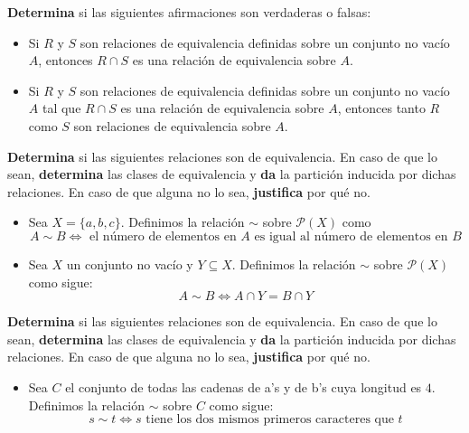 \documentclass[oneside]{style}
\begin{document}
\begin{questions}[label=\protect\circled{\bfseries\arabic*}]
    \question
    {
        \textbf{Determina} si las siguientes afirmaciones son verdaderas o 
        falsas:
        \begin{itemize}
            \item Si $R$ y $S$ son relaciones de equivalencia definidas sobre 
            un conjunto no vacío $A$, entonces $R \cap S$ es una relación de 
            equivalencia sobre $A$. 

            \item Si $R$ y $S$ son relaciones de equivalencia definidas sobre 
            un conjunto no vacío $A$ tal que $R \cap S$ es una relación de 
            equivalencia sobre $A$, entonces tanto $R$ como $S$ son relaciones 
            de equivalencia sobre $A$.  
        \end{itemize}
    }

    \question
    {
        \textbf{Determina} si las siguientes relaciones son de equivalencia. 
        En caso de que lo sean, \textbf{determina} las clases de equivalencia 
        y \textbf{da} la partición inducida por dichas relaciones. En caso de 
        que alguna no lo sea, \textbf{justifica} por qué no. 
        \begin{itemize}
            \item Sea $X = \{a,b,c\}$. Definimos la relación $\sim$ sobre 
            $\mathcal{P}(X)$ como 
            \begin{equation*}
                A \sim B \Leftrightarrow \text{ el número de elementos en } A 
                \text{ es igual al número de elementos en } B
            \end{equation*}

            \item Sea $X$ un conjunto no vacío y $Y \subseteq X$. Definimos la 
            relación $\sim$ sobre $\mathcal{P}(X)$ como sigue: 
            \begin{equation*}
                A \sim B \Leftrightarrow A \cap Y = B \cap Y
            \end{equation*}
        \end{itemize}
    }

    \question
    {
        \textbf{Determina} si las siguientes relaciones son de equivalencia. 
        En caso de que lo sean, \textbf{determina} las clases de equivalencia 
        y \textbf{da} la partición inducida por dichas relaciones. En caso de 
        que alguna no lo sea, \textbf{justifica} por qué no.
        \begin{itemize}
            \item Sea $C$ el conjunto de todas las cadenas de a's y de b's 
            cuya longitud es $4$. Definimos la relación $\sim$ sobre $C$ como 
            sigue:
            \begin{equation*}
                s \sim t \Leftrightarrow s \text{ tiene los dos mismos primeros 
                caracteres que } t
            \end{equation*}


\end{itemize}}
\end{questions}
\end{document}
